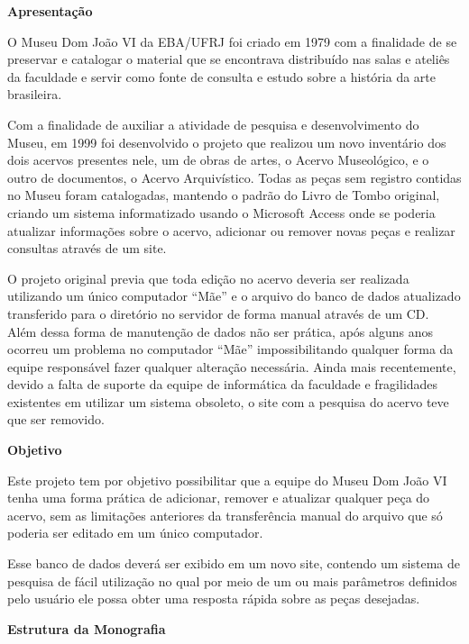\documentclass[a4paper,12pt,oneside,onecolumn,final,fleqn]{repUERJ}
\begin{document}
$\!$\\
\textbf{Apresentação}

\vspace{10pt}

O Museu Dom João VI da EBA/UFRJ foi criado em 1979 com a finalidade de se preservar e catalogar o material que se encontrava distribuído nas salas e ateliês da faculdade e servir como fonte de consulta e estudo sobre a história da arte brasileira. 

Com a finalidade de auxiliar a atividade de pesquisa e desenvolvimento do Museu, em 1999 foi desenvolvido o projeto que realizou um novo inventário dos dois acervos presentes nele, um de obras de artes, o Acervo Museológico, e o outro de documentos, o Acervo Arquivístico. Todas as peças sem registro contidas no Museu foram catalogadas, mantendo o padrão do Livro de Tombo original, criando um sistema informatizado usando o Microsoft Access onde se poderia atualizar informações sobre o acervo, adicionar ou remover novas peças e realizar consultas através de um site.

O projeto original previa que toda edição no acervo deveria ser realizada utilizando um único computador ``Mãe'' e o arquivo do banco de dados atualizado transferido para o diretório no servidor de forma manual através de um CD. Além dessa forma de manutenção de dados não ser prática, após alguns anos ocorreu um problema no computador ``Mãe'' impossibilitando qualquer forma da equipe responsável fazer qualquer alteração necessária. Ainda mais recentemente, devido a falta de suporte da equipe de informática da faculdade e fragilidades existentes em utilizar um sistema obsoleto, o site com a pesquisa do acervo teve que ser removido.

\vspace{10pt}
$\!$\\
\textbf{Objetivo}
\vspace{10pt}

Este projeto tem por objetivo possibilitar que a equipe do Museu Dom João VI tenha uma forma prática de adicionar, remover e atualizar qualquer peça do acervo, sem as limitações anteriores da transferência manual do arquivo que só poderia ser editado em um único computador.

Esse banco de dados deverá ser exibido em um novo site, contendo um sistema de pesquisa de fácil utilização no qual por meio de um ou mais parâmetros definidos pelo usuário ele possa obter uma resposta rápida sobre as peças desejadas.

\vspace{10pt}
$\!$\\
\textbf{Estrutura da Monografia}
\vspace{10pt}
\end{document}
